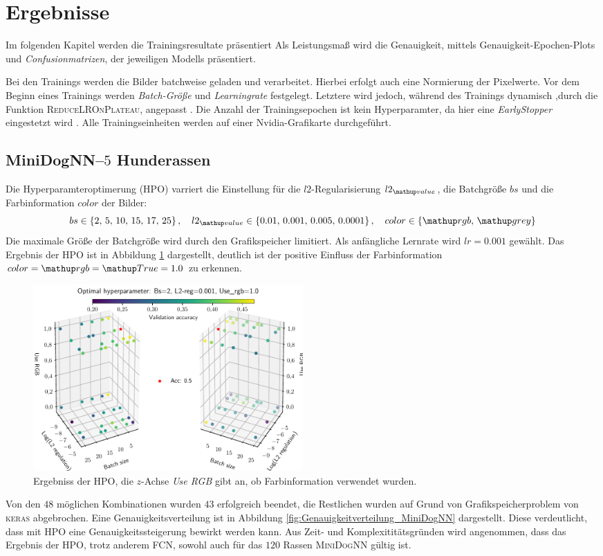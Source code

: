 \section{Ergebnisse}
Im folgenden Kapitel werden die Trainingsresultate präsentiert
Als Leistungsmaß wird die Genauigkeit, mittels Genauigkeit-Epochen-Plots
und \emph{Confusionmatrizen}, der jeweiligen Modells präsentiert.

Bei den Trainings werden die Bilder batchweise geladen und verarbeitet.
Hierbei erfolgt auch eine Normierung der Pixelwerte.
Vor dem Beginn eines Trainings werden \emph{Batch-Größe} und
\emph{Learningrate} festgelegt. Letztere wird jedoch, während des Trainings dynamisch
,durch die Funktion \textsc{ReduceLROnPlateau}, angepasst \cite{keras_ReduceLROnPlateau}.
 Die Anzahl der Trainingsepochen ist kein Hyperparamter, da hier eine \emph{EarlyStopper}
eingestetzt wird \cite{keras_EarlyStopping}.
Alle Trainingseinheiten werden auf einer Nvidia-Grafikarte
durchgeführt.

\subsection{MiniDogNN--$5$ Hunderassen}
Die Hyperparamteroptimerung (HPO) varriert die Einstellung
für die $l2$-Regularisierung $l2\ua{value}$, die Batchgröße $bs$
und die Farbinformation $color$ der Bilder:
\begin{equation}
  \label{eq:Parameterraum_MiniDogNN}
  bs\in\left\{2,\, 5, \,10, \,15,\, 17,\, 25\right\}, \quad l2\ua{value}\in\left\{0.01, \,0.001,\, 0.005,\, 0.0001\right\}, \quad color\in\left\{\map{rgb}, \,\map{grey}\right\}
\end{equation}
Die maximale Größe der Batchgröße wird durch den Grafikspeicher limitiert.
Als anfängliche Lernrate wird $lr=0.001$ gewählt.
Das Ergebnis der HPO ist in Abbildung \ref{fig:Hyperraum_MiniDogNN} dargestellt,
deutlich ist der positive Einfluss der Farbinformation $color=\map{rgb}=\map{True}=1.0$
zu erkennen.
\begin{figure}
\centering
\includegraphics[width=0.5\textwidth]{../../final_data/MiniNN_n5/hyper_raum.pdf}
\caption{Ergebniss der HPO, die $z$-Achse \emph{Use RGB} gibt an, ob Farbinformation
        verwendet wurden.}
\label{fig:Hyperraum_MiniDogNN}
\end{figure}
Von den $48$ möglichen Kombinationen wurden $43$ erfolgreich beendet, die Restlichen
wurden auf Grund von Grafikspeicherproblem von \textsc{keras} abgebrochen. Eine
Genauigkeitsverteilung ist in Abbildung \ref{fig:Genauigkeitverteilung_MiniDogNN}
dargestellt. Diese verdeutlicht, dass mit HPO
eine Genauigkeitssteigerung bewirkt werden kann. Aus Zeit- und Komplexititätsgründen wird
angenommen, dass das Ergebnis der HPO, trotz anderem
FCN, sowohl auch für das $120$ Rassen \textsc{MiniDogNN} gültig ist.

